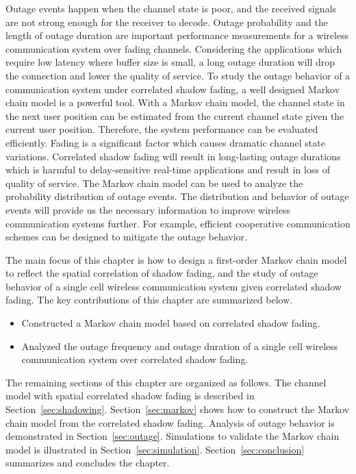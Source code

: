 \par Outage events happen when the channel state is poor, and the received signals are not strong enough for the receiver to decode. Outage probability and the length of outage duration are important performance measurements for a wireless communication system over fading channels. Considering the applications which require low latency where buffer size is small, a long outage duration will drop the connection and lower the quality of service. To study the outage behavior of a communication system under correlated shadow fading, a well designed Markov chain model is a powerful tool. With a Markov chain model, the channel state in the next user position can be estimated from the current channel state given the current user position. Therefore, the system performance can be evaluated efficiently. Fading is a significant factor which causes dramatic channel state variations. Correlated shadow fading will result in long-lasting outage durations which is harmful to delay-sensitive real-time applications and result in loss of quality of service. The Markov chain model can be used to analyze the probability distribution of outage events. The distribution and behavior of outage events will provide us the necessary information to improve wireless communication systems further. For example, efficient cooperative communication schemes can be designed to mitigate the outage behavior.
\par The main focus of this chapter is how to design a first-order Markov chain model to reflect the spatial correlation of shadow fading, and the study of outage behavior of a single cell wireless communication system given correlated shadow fading. The key contributions of this chapter are summarized below.
\begin{itemize}
\item Constructed a Markov chain model based on correlated shadow fading.
\item Analyzed the outage frequency and outage duration of a single cell wireless communication system over correlated shadow fading.
\end{itemize}
 The remaining sections of this chapter are organized as follows. The channel model with spatial correlated shadow fading is described in Section~\ref{sec:shadowing}. Section~\ref{sec:markov} shows how to construct the Markov chain model from the correlated shadow fading. Analysis of outage behavior is demonstrated in Section~\ref{sec:outage}. Simulations to validate the Markov chain model is illustrated in Section~\ref{sec:simulation}. Section~\ref{sec:conclusion} summarizes and concludes the chapter.
